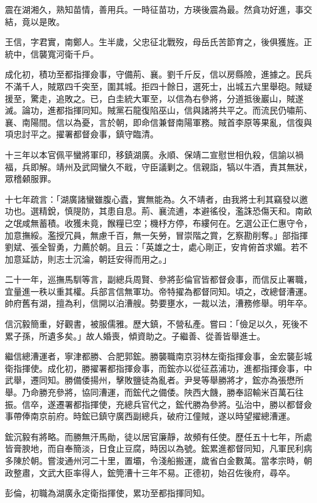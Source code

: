 \begin{pinyinscope}
震在湖湘久，熟知苗情，善用兵。一時征苗功，方瑛後震為最。然貪功好進，事交結，竟以是敗。

王信，字君實，南鄭人。生半歲，父忠征北戰歿，母岳氏苦節育之，後俱獲旌。正統中，信襲寬河衛千戶。

成化初，積功至都指揮僉事，守備荊、襄。劉千斤反，信以房縣險，進據之。民兵不滿千人，賊眾四千突至，圍其城。拒四十餘日，選死士，出城五六里舉砲。賊疑援至，驚走，追敗之。已，白圭統大軍至，以信為右參將，分道抵後巖山，賊遂滅。論功，進都指揮同知。賊黨石龍復陷巫山，信與諸將共平之。而流民仍嘯荊、襄、南陽間。信以為憂，言於朝，即命信兼督南陽軍務。賊首李原等果亂，信復與項忠討平之。擢署都督僉事，鎮守臨清。

十三年以本官佩平蠻將軍印，移鎮湖廣。永順、保靖二宣慰世相仇殺，信諭以禍福，兵即解。靖州及武岡蠻久不戢，守臣議剿之。信親詣，犒以牛酒，責其無狀，眾稽顙服罪。

十七年疏言：「湖廣諸蠻雖腹心蠹，實無能為。久不靖者，由我將士利其竊發以邀功也。選精銳，慎隄防，其患自息。荊、襄流逋，本避徭役，濫誅恐傷天和。南畝之氓咸無蓄積。收獲未竟，餱糧已空；機杼方停，布縷何在。乞選公正仁惠守令，加意撫綏。濫授冗員，無慮千百，無一矢勞，冒崇階之賞，乞察勘削奪。」部指揮劉斌、張全智勇，力薦於朝。且云：「英雄之士，處心剛正，安肯俯首求媚。若不加意延訪，則志士沉淪，朝廷安得而用之。」

二十一年，巡撫馬馴等言，副總兵周賢、參將彭倫官皆都督僉事，而信反止署職，宜量進一秩以重其權。兵部言信無軍功。帝特擢為都督同知。頃之，改總督漕運。帥府舊有湖，擅為利，信開以泊漕艘。勢要壅水，一裁以法，漕務修舉。明年卒。

信沉毅簡重，好觀書，被服儒雅。歷大鎮，不營私產。嘗曰：「儉足以久，死後不累子孫，所遺多矣。」故人婚喪，傾資助之。子繼善、從善皆舉進士。

繼信總漕運者，寧津都勝、合肥郭鋐。勝襲職南京羽林左衛指揮僉事，金宏襲彭城衛指揮使。成化初，勝擢署都指揮僉事，而鋐亦以從征荔浦功，進都指揮僉事，中武舉，遷同知。勝備倭揚州，擊敗鹽徒為亂者。尹旻等舉勝將才，鋐亦為張懋所舉。乃命勝充參將，協同漕運，而鋐代之備倭。陜西大饑，勝奉詔輸米百萬石往振。信卒，遂遷署都指揮使，充總兵官代之，鋐代勝為參將。弘治中，勝以都督僉事帶俸南京前府。時鋐已鎮守廣西副總兵，破府江僮賊，遂以時望擢總漕運。

鋐沉毅有將略。而勝無汗馬勛，徒以居官廉靜，故頻有任使。歷任五十七年，所處皆膏腴地，而自奉簡淡，日食止豆腐，時因以為號。鋐累進都督同知，凡軍民利病多陳於朝。嘗浚通州河二十里，置壩，令淺船搬運，歲省白金數萬。當孝宗時，朝政整肅，文武大臣率得人，鋐筦漕十三年不易。正德初，始召佐後府，尋卒。

彭倫，初職為湖廣永定衛指揮使，累功至都指揮同知。


\end{pinyinscope}
